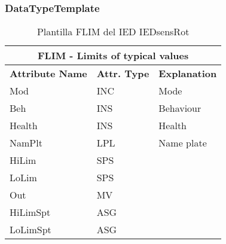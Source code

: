     \subsubsection{DataTypeTemplate}
    \begin{table}[H]
    \begin{center}
    \begin{tabular}{|l|l|p{8.5cm}|}
            \hline
            \multicolumn{3}{|c|}{\cellcolor[gray]{0.8} \textbf{ FLIM}  - Limits of typical values} \\
            \hline
            \textbf{Attribute Name} & \textbf{Attr. Type} & \textbf{Explanation} \\
            \hline 
            Mod & INC & Mode \\
            \hline
            Beh & INS & Behaviour \\
            \hline
            Health & INS & Health \\
            \hline
            NamPlt & LPL & Name plate \\
            \hline
            HiLim & SPS &   \\
            \hline
            LoLim & SPS &   \\
            \hline
            Out & MV &   \\
            \hline
            HiLimSpt & ASG &   \\
            \hline
            LoLimSpt & ASG &   \\
            \hline
    \end{tabular}
    \caption{Plantilla FLIM del IED IEDsensRot}
    \label{table:lnTypeFLIM_tipical}
    \end{center}
    \end{table}
    
    
    